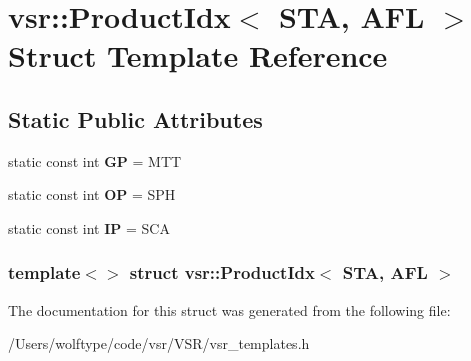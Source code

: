 \hypertarget{structvsr_1_1_product_idx_3_01_s_t_a_00_01_a_f_l_01_4}{\section{vsr\-:\-:Product\-Idx$<$ S\-T\-A, A\-F\-L $>$ Struct Template Reference}
\label{structvsr_1_1_product_idx_3_01_s_t_a_00_01_a_f_l_01_4}
}
\subsection*{Static Public Attributes}
\begin{DoxyCompactItemize}
\item 
\hypertarget{structvsr_1_1_product_idx_3_01_s_t_a_00_01_a_f_l_01_4_a2cb43ea3375f66d1a63ddfd28a9d01c4}{static const int {\bfseries G\-P} = M\-T\-T}\label{structvsr_1_1_product_idx_3_01_s_t_a_00_01_a_f_l_01_4_a2cb43ea3375f66d1a63ddfd28a9d01c4}

\item 
\hypertarget{structvsr_1_1_product_idx_3_01_s_t_a_00_01_a_f_l_01_4_a7ed9243be0d132b83ca7a4741bce4cae}{static const int {\bfseries O\-P} = S\-P\-H}\label{structvsr_1_1_product_idx_3_01_s_t_a_00_01_a_f_l_01_4_a7ed9243be0d132b83ca7a4741bce4cae}

\item 
\hypertarget{structvsr_1_1_product_idx_3_01_s_t_a_00_01_a_f_l_01_4_a08085bbf90739e5ec10e907ae2d9fa36}{static const int {\bfseries I\-P} = S\-C\-A}\label{structvsr_1_1_product_idx_3_01_s_t_a_00_01_a_f_l_01_4_a08085bbf90739e5ec10e907ae2d9fa36}

\end{DoxyCompactItemize}
\subsubsection*{template$<$$>$ struct vsr\-::\-Product\-Idx$<$ S\-T\-A, A\-F\-L $>$}



The documentation for this struct was generated from the following file\-:\begin{DoxyCompactItemize}
\item 
/\-Users/wolftype/code/vsr/\-V\-S\-R/vsr\-\_\-templates.\-h\end{DoxyCompactItemize}
